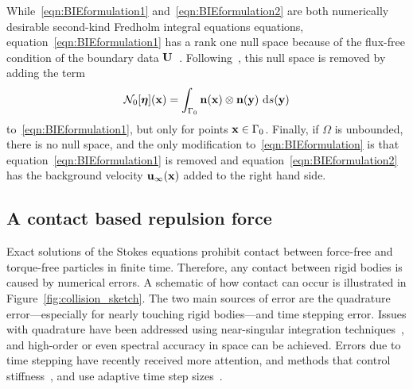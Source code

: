 \documentclass[preprint, 10pt]{elsarticle}
\begin{document}
While~\eqref{eqn:BIEformulation1} and~\eqref{eqn:BIEformulation2} are
both numerically desirable second-kind Fredholm integral equations
equations, equation~\eqref{eqn:BIEformulation1} has a rank one null
space because of the flux-free condition of the boundary data
${\mathbf{U}}$~\cite{Ladyzhenskaya1963}.  Following~\cite{Power1993}, this null
space is removed by adding the term 
\begin{align}
\label{eqn:N0_modification} 
  \mathcal{N}_0[{\boldsymbol\eta}]({\mathbf{x}}) = \int_{\Gamma_0} 
    {\mathbf{n}}({\mathbf{x}})\otimes{\mathbf{n}}({\mathbf{y}})~\text{d}s({\mathbf{y}})
\end{align}
to~\eqref{eqn:BIEformulation1}, but only for points ${\mathbf{x}} \in \Gamma_0$.
Finally, if $\Omega$ is unbounded, there is no null space, and
the only modification to~\eqref{eqn:BIEformulation} is that
equation~\eqref{eqn:BIEformulation1} is removed and
equation~\eqref{eqn:BIEformulation2} has the background velocity
${\mathbf{u}}_\infty({\mathbf{x}})$ added to the right hand side.


\subsection{A contact based repulsion force}
\label{sec:repulsion}
Exact solutions of the Stokes equations prohibit contact between
force-free and torque-free particles in finite time.  Therefore, any
contact between rigid bodies is caused by numerical errors.  A schematic
of how contact can occur is illustrated in
Figure~\ref{fig:collision_sketch}.  The two main sources of error are
the quadrature error---especially for nearly touching rigid bodies---and
time stepping error.  Issues with quadrature have been addressed using
near-singular integration techniques~\cite{Ying2006, Klockner2013,
Quaife2014, Barnett2015, Beale2001, Cortez2001},
and high-order or even spectral accuracy in space can be achieved.
Errors due to time stepping have recently received more attention, and
methods that control stiffness~\cite{Quaife2014}, and use adaptive time step sizes~\cite{Kropinski1999,
Quaife2015, Sorgentone2018}.
\end{document}
